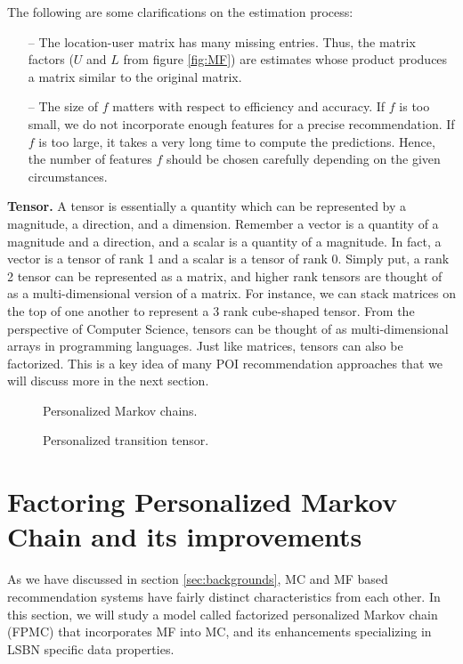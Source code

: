 \documentclass{sig-alternate}
\begin{document}
The following are some clarifications on the estimation process:
\begin{itemize}
\item[--] The location-user matrix has many missing entries. Thus, the matrix factors ($U$ and $L$ from figure \ref{fig:MF}) are 
estimates whose product produces a matrix similar to the original matrix.
\item[--] The size of $f$ matters with respect to efficiency and accuracy. If $f$ is too small, we do not 
incorporate enough features for a precise recommendation. If $f$ is too large, it takes a very long time 
to compute the predictions. Hence, the number of features $f$ should be chosen carefully depending on 
the given circumstances.
\end{itemize}

\textbf{Tensor.} A tensor is essentially a quantity which can be represented by a magnitude, a direction, and 
a dimension. Remember a vector is a quantity of a magnitude and a direction, and a scalar 
is a quantity of a magnitude. In fact, a vector is a tensor of rank 1 and a scalar is a tensor 
of rank 0. Simply put, a rank 2 tensor can be represented as a matrix, and higher rank tensors 
are thought of as a multi-dimensional version of a matrix. For instance, we can stack matrices on 
the top of one another to represent a 3 rank cube-shaped tensor. From the perspective of Computer Science, tensors can be 
thought of as multi-dimensional arrays in programming languages.
Just like matrices, tensors can also be factorized. This is a key idea of many POI recommendation approaches 
that we will discuss more in the next section.

\begin{figure}
\centering
{}
\caption{Personalized Markov chains.}
\label{fig:FPMC_naive}
\end{figure}

\begin{figure}
\centering
{}
\caption{Personalized transition tensor.}
\label{fig:FPMC}
\end{figure}

\section{Factoring Personalized Markov Chain and its improvements}
\label{sec:fpmc}

As we have discussed in section \ref{sec:backgrounds}, MC and MF based recommendation systems
have fairly distinct characteristics from each other. In this section, we will study a model called 
factorized personalized Markov chain (FPMC) that incorporates MF into MC, and its 
enhancements specializing in LSBN specific data properties.
\end{document}
